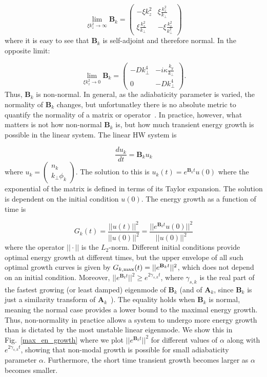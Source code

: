 \documentclass[twocolumn,showkeys,superscriptaddress]{revtex4}
\def\beq{\begin{equation}}
\def\eeq{\end{equation}}
\newcommand{\diff}[2]{\frac{d#1}{d#2}}
\begin{document}
\beq
\label{B_norm_limit}
\displaystyle\lim_{\xi k_z^2 \to \infty} \mathbf{B}_k = \left( \begin{array}{cc} -\xi k_z^2 & \xi \frac{k_z^2}{k_\perp} \\  \xi \frac{k_z^2}{k_\perp} & - \xi \frac{k_z^2}{k_\perp^2} \end{array} \right)
\eeq
where it is easy to see that $\mathbf{B}_k$ is self-adjoint and therefore normal. In the opposite limit:

\beq
\label{B_norm_limit0}
\displaystyle\lim_{\xi k_z^2 \to 0} \mathbf{B}_k = \left( \begin{array}{cc} - D k_\perp^4 & -i \kappa \frac{k_y}{k_\perp} \\ 0  & - D k_\perp^4\end{array} \right).
\eeq
Thus, $\mathbf{B}_k$ is non-normal. In general, as the adiabaticity parameter is varied, the normality of $\mathbf{B}_k$ changes, but unfortunatley there is no absolute metric to quantify
the normality of a matrix or operator~\cite{trefethen2005}. In practice, however, what matters is not how non-normal $\mathbf{B}_k$ is, but how much transient energy growth is possible in the linear
system. The linear HW system is

\beq
\label{lin_HW}
\diff{u_k}{t} = \mathbf{B}_k u_k
\eeq
where $u_k = \left( \begin{array}{cc} n_k \\ k_\perp \phi_k \end{array} \right)$. The solution to this is $u_k(t) = e^{\mathbf{B}_k t} u(0)$ where the exponential of the matrix is defined in terms of
its Taylor expansion. The solution is dependent on the initial condition $u(0)$. The energy growth as a function of time is

\beq
\label{Gt}
G_k(t) = \frac{||u(t)||^2}{||u(0)||^2} = \frac{||e^{\mathbf{B}_k t} u(0)||^2}{||u(0)||^2}
\eeq
where the operator $|| \cdot ||$ is the $L_2$-norm. Different initial conditions provide optimal energy growth at different times, but the upper envelope of all such optimal growth curves is given by
$G_{k,\rm{max}}(t) = ||e^{\mathbf{B}_k t}||^2$, which does not depend on an initial condition.
Moreover, $||e^{\mathbf{B}_k t}||^2 \ge e^{2 \gamma_{s,k} t}$, where $\gamma_{s,k}$ is the real part of
the fastest growing (or least damped) eigenmode of $\mathbf{B}_k$ (and of $\mathbf{A}_k$, since $\mathbf{B}_k$ is just a similarity transform of $\mathbf{A}_k$~\cite{camargo1998}). 
The equality holds when $\mathbf{B}_k$ is normal, meaning the normal case provides a lower bound to the maximal energy growth. 
Thus, non-normality in practice allows a system to undergo more energy growth than is dictated by the most unstable linear eigenmode. We show this in Fig.~\ref{max_en_growth} where we plot
$||e^{\mathbf{B}_k t}||^2$ for different values of $\alpha$ along with $e^{2 \gamma_{s,k} t}$, showing that non-modal growth is possible for small adiabaticity parameter $\alpha$. Furthermore,
the short time transient growth becomes larger as $\alpha$ becomes smaller.
\end{document}

